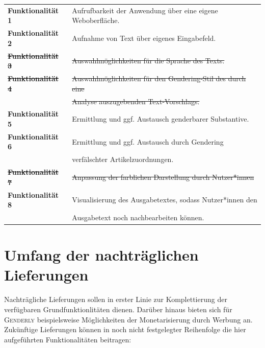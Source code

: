 \documentclass[paper=a4, parskip=half]{scrreprt}
\begin{document}
\begin{table}[!htb]
\begin{tabular}{ll}
\textbf{Funktionalität 1} & Aufrufbarkeit der Anwendung über eine eigene Weboberfläche. \vspace{0.1cm} \\
\textbf{Funktionalität 2} & Aufnahme von Text über eigenes Eingabefeld. \vspace{0.1cm} \\
\sout{\textbf{Funktionalität 3}} & \sout{Auswahlmöglichkeiten für die Sprache des Texts.} \vspace{0.1cm} \\
\sout{\textbf{Funktionalität 4}} & \sout{Auswahlmöglichkeiten für den Gendering-Stil des durch eine} \\
 & \sout{Analyse auszugebenden Text-Vorschlags.} \vspace{0.1cm} \\
\textbf{Funktionalität 5} & Ermittlung und ggf. Austausch genderbarer Substantive. \vspace{0.1cm} \\
\textbf{Funktionalität 6} & Ermittlung und ggf. Austausch durch Gendering \\
& verfälschter Artikelzuordnungen. \vspace{0.1cm} \\
\sout{\textbf{Funktionalität 7}} & \sout{Anpassung der farblichen Darstellung durch Nutzer*innen} \vspace{0.1cm} \\
\textbf{Funktionalität 8} & Visualisierung des Ausgabetextes, sodass Nutzer*innen den \\
 & Ausgabetext noch nachbearbeiten können. \vspace{0.1cm} \\
\end{tabular}
\end{table}

\section{Umfang der nachträglichen Lieferungen}

Nachträgliche Lieferungen sollen in erster Linie zur Komplettierung der verfügbaren Grundfunktionlitäten dienen. Darüber hinaus bieten sich für \textsc{Genderly} beispielsweise Möglichkeiten der Monetarisierung durch Werbung an. Zukünftige Lieferungen können in noch nicht festgelegter Reihenfolge die hier aufgeführten Funktionalitäten beitragen:
\end{document}
